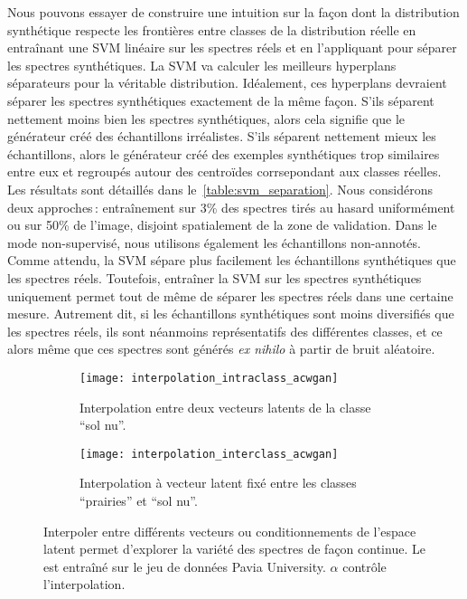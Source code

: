 Nous pouvons essayer de construire une intuition sur la façon dont la distribution synthétique respecte les frontières entre classes de la distribution réelle en entraînant une \gls{SVM} linéaire sur les spectres réels et en l'appliquant pour séparer les spectres synthétiques. La \gls{SVM} va calculer les meilleurs hyperplans séparateurs pour la véritable distribution. Idéalement, ces hyperplans devraient séparer les spectres synthétiques exactement de la même façon. S'ils séparent nettement moins bien les spectres synthétiques, alors cela signifie que le générateur créé des échantillons irréalistes. S'ils séparent nettement mieux les échantillons, alors le générateur créé des exemples synthétiques trop similaires entre eux et regroupés autour des centroïdes corrsepondant aux classes réelles. Les résultats sont détaillés dans le~\cref{table:svm_separation}. Nous considérons deux approches\,: entraînement sur 3\% des spectres tirés au hasard uniformément ou sur 50\% de l'image, disjoint spatialement de la zone de validation. Dans le mode non-supervisé, nous utilisons également les échantillons non-annotés. Comme attendu, la \gls{SVM} sépare plus facilement les échantillons synthétiques que les spectres réels. Toutefois, entraîner la \gls{SVM} sur les spectres synthétiques uniquement permet tout de même de séparer les spectres réels dans une certaine mesure. Autrement dit, si les échantillons synthétiques sont moins diversifiés que les spectres réels, ils sont néanmoins représentatifs des différentes classes, et ce alors même que ces spectres sont générés \emph{ex nihilo} à partir de bruit aléatoire.

\begin{figure}[!t]
\begin{subfigure}{0.5\textwidth}
\texttt{[image: interpolation\_intraclass\_acwgan]}
\caption{Interpolation entre deux vecteurs latents de la classe ``sol nu''.}
\end{subfigure}%
\begin{subfigure}{0.5\textwidth}
\texttt{[image: interpolation\_interclass\_acwgan]}
\caption{Interpolation à vecteur latent fixé entre les classes ``prairies'' et ``sol nu''.}
\end{subfigure}
\caption{Interpoler entre différents vecteurs ou conditionnements de l'espace latent permet d'explorer la variété des spectres de façon continue. Le  est entraîné sur le jeu de données Pavia University. $\alpha$ contrôle l'interpolation.}
\label{fig:interpolation}
\end{figure}

